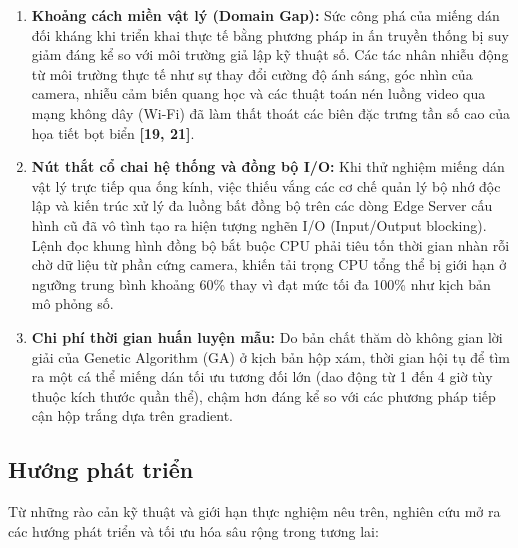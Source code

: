 \documentclass[a4paper,fleqn]{cas-dc}
\begin{document}
\begin{enumerate}
\def\labelenumi{\arabic{enumi}.}
\item
  \textbf{Khoảng cách miền vật lý (Domain Gap):} Sức công phá của miếng
  dán đối kháng khi triển khai thực tế bằng phương pháp in ấn truyền
  thống bị suy giảm đáng kể so với môi trường giả lập kỹ thuật số. Các
  tác nhân nhiễu động từ môi trường thực tế như sự thay đổi cường độ ánh
  sáng, góc nhìn của camera, nhiễu cảm biến quang học và các thuật toán
  nén luồng video qua mạng không dây (Wi-Fi) đã làm thất thoát các biên
  đặc trưng tần số cao của họa tiết bọt biển \textbf{{[}19, 21{]}}.
\item
  \textbf{Nút thắt cổ chai hệ thống và đồng bộ I/O:} Khi thử nghiệm
  miếng dán vật lý trực tiếp qua ống kính, việc thiếu vắng các cơ chế
  quản lý bộ nhớ độc lập và kiến trúc xử lý đa luồng bất đồng bộ trên
  các dòng Edge Server cấu hình cũ đã vô tình tạo ra hiện tượng nghẽn
  I/O (Input/Output blocking). Lệnh đọc khung hình đồng bộ bắt buộc CPU
  phải tiêu tốn thời gian nhàn rỗi chờ dữ liệu từ phần cứng camera,
  khiến tải trọng CPU tổng thể bị giới hạn ở ngưỡng trung bình khoảng
  60\% thay vì đạt mức tối đa 100\% như kịch bản mô phỏng số.
\item
  \textbf{Chi phí thời gian huấn luyện mẫu:} Do bản chất thăm dò không
  gian lời giải của Genetic Algorithm (GA) ở kịch bản hộp xám, thời gian
  hội tụ để tìm ra một cá thể miếng dán tối ưu tương đối lớn (dao động
  từ 1 đến 4 giờ tùy thuộc kích thước quần thể), chậm hơn đáng kể so với
  các phương pháp tiếp cận hộp trắng dựa trên gradient.
\end{enumerate}

\subsection{Hướng phát triển}



Từ những rào cản kỹ thuật và giới hạn thực nghiệm nêu trên, nghiên cứu
mở ra các hướng phát triển và tối ưu hóa sâu rộng trong tương lai:
\end{document}
